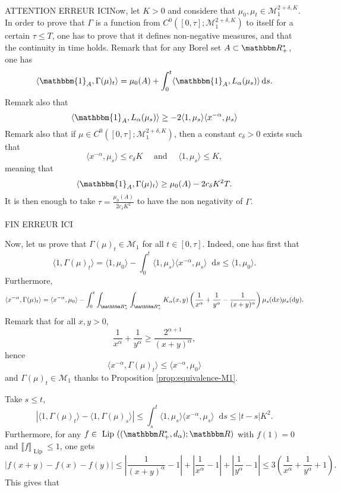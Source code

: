 \documentclass[a4paper,11pt, reqno]{amsart}
\newcommand{\cM}{\mathcal{M}}	\newcommand{\MM}{\mathbbm{M}}
\newcommand{\dd}{\mathop{}\!\mathrm{d}}
\newcommand{\red}[1]{{\color{red} #1}}
\newcommand{\1}{\mathbbm{1}}
\theoremstyle{plain}
\theoremstyle{definition}
\begin{document}
\

\red{\red{ATTENTION ERREUR ICI}Now, let $K > 0$ and
considere that $\mu_0, \mu_t \in \cM^{2 + \delta, K}_1$. In order to
prove that $\Gamma$ is a function from $C^0 ([0, \tau] ; \cM^{2 +
\delta, K}_1)$ to itself for a certain $\tau \le T$, one has to prove
that it defines non-negative measures, and that the continuity in time holds.
Remark that for any Borel set $A \subset \RR_+^{\ast}$, one has
\[ \langle \mathbbm{1}_A, \Gamma (\mu)_t \rangle = \mu_0 (A) + \int_0^t
   \langle \mathbbm{1}_A, L_{\alpha} (\mu_s) \rangle \dd s. \]
Remark also that
\[ \langle \mathbbm{1}_A, L_{\alpha} (\mu_s) \rangle \ge - 2 \langle 1,
   \mu_s \rangle \langle x^{- \alpha}, \mu_s \rangle \]
Remark also that if $\mu \in C^0 ([0, \tau] ; \cM^{2 + \delta, K}_1)$,
then a constant $c_{\delta} > 0$ exists such that
\[ \langle x^{- \alpha}, \mu_s \rangle \le c_{\delta} K \quad
    \text{ and } \quad \langle 1, \mu_s \rangle \le K, \]
meaning that
\[ \langle \mathbbm{1}_A, \Gamma (\mu)_t \rangle \ge \mu_0 (A) - 2
   c_{\delta} K^2 T. \]
It is then enough to take $\tau = \frac{\mu_0 (A)}{2 c_{\delta} K^2}$ to have
the non negativity of $\Gamma$.

\red{FIN ERREUR ICI}

Now, let us prove that $\Gamma (\mu)_t \in \cM_1$ for all $t \in [0,
\tau]$. Indeed, one has first that
\[ \langle 1, \Gamma (\mu)_t \rangle = \langle 1, \mu_0 \rangle - \int_0^t
   \langle 1, \mu_s \rangle \langle x^{- \alpha}, \mu_s \rangle \dd s
   \le \langle 1, \mu_0 \rangle . \]
Furthermore,
\[ \langle x^{- \alpha}, \Gamma (\mu)_t \rangle = \langle x^{- \alpha}, \mu_0
   \rangle - \int_0^t \int_{\RR^{\ast}_+} \int_{\RR^{\ast}_+}
   K_{\alpha} (x, y) \left( \frac{1}{x^{\alpha}} + \frac{1}{y^{\alpha}} -
   \frac{1}{(x + y)^{\alpha}} \right) \mu_s (\dd x) \mu_s (\dd y) . \]
Remark that for all $x, y > 0$,
\begin{equation}
  \frac{1}{x^{\alpha}} + \frac{1}{y^{\alpha}} \ge \frac{2^{\alpha +
  1}}{(x + y)^{\alpha}} \label{eq:bound-xyalpha},
\end{equation}
hence
\[ \langle x^{- \alpha}, \Gamma (\mu)_t \rangle \le \langle x^{-
   \alpha}, \mu_0 \rangle \]
and $\Gamma (\mu)_t \in \cM_1$ thanks to Proposition
\ref{prop:equivalence-M1}.

Take $s \le t$,
\[ | \langle 1, \Gamma (\mu)_t \rangle - \langle 1, \Gamma (\mu)_s \rangle |
   \le \int_s^t \langle 1, \mu_s \rangle \langle x^{- \alpha}, \mu_s
   \rangle \dd s \le | t - s | K^2 . \]
Furthermore, for any $f \in  \text{ Lip } ((\RR_+^{\ast}, d_{\alpha}) ;
\RR)$ with $f (1) = 0$ and $\llbracket f \rrbracket_{ \text{ Lip } }
\le 1$, one gets
\[ | f (x + y) - f (x) - f (y) | \le \left| \frac{1}{(x + y)^{\alpha}} -
   1 \right| + \left| \frac{1}{x^{\alpha}} - 1 \right| + \left|
   \frac{1}{y^{\alpha}} - 1 \right| \le 3 \left( \frac{1}{x^{\alpha}} +
   \frac{1}{y^{\alpha}} + 1 \right) . \]
This gives that

}
\end{document}
